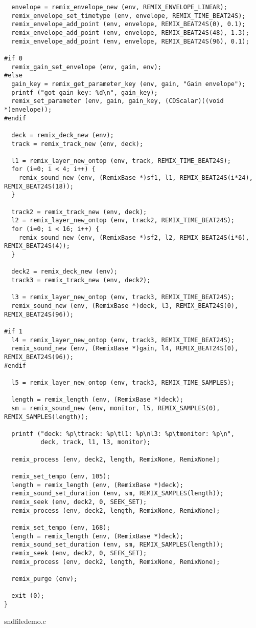 \begin{verbatim}
  envelope = remix_envelope_new (env, REMIX_ENVELOPE_LINEAR);
  remix_envelope_set_timetype (env, envelope, REMIX_TIME_BEAT24S);
  remix_envelope_add_point (env, envelope, REMIX_BEAT24S(0), 0.1);
  remix_envelope_add_point (env, envelope, REMIX_BEAT24S(48), 1.3);
  remix_envelope_add_point (env, envelope, REMIX_BEAT24S(96), 0.1);

#if 0
  remix_gain_set_envelope (env, gain, env);
#else
  gain_key = remix_get_parameter_key (env, gain, "Gain envelope");
  printf ("got gain key: %d\n", gain_key);
  remix_set_parameter (env, gain, gain_key, (CDScalar)((void *)envelope));
#endif

  deck = remix_deck_new (env);
  track = remix_track_new (env, deck);

  l1 = remix_layer_new_ontop (env, track, REMIX_TIME_BEAT24S);
  for (i=0; i < 4; i++) {
    remix_sound_new (env, (RemixBase *)sf1, l1, REMIX_BEAT24S(i*24), REMIX_BEAT24S(18));
  }

  track2 = remix_track_new (env, deck);
  l2 = remix_layer_new_ontop (env, track2, REMIX_TIME_BEAT24S);
  for (i=0; i < 16; i++) {
    remix_sound_new (env, (RemixBase *)sf2, l2, REMIX_BEAT24S(i*6), REMIX_BEAT24S(4));
  }

  deck2 = remix_deck_new (env);
  track3 = remix_track_new (env, deck2);

  l3 = remix_layer_new_ontop (env, track3, REMIX_TIME_BEAT24S);
  remix_sound_new (env, (RemixBase *)deck, l3, REMIX_BEAT24S(0), REMIX_BEAT24S(96));

#if 1
  l4 = remix_layer_new_ontop (env, track3, REMIX_TIME_BEAT24S);
  remix_sound_new (env, (RemixBase *)gain, l4, REMIX_BEAT24S(0), REMIX_BEAT24S(96));
#endif

  l5 = remix_layer_new_ontop (env, track3, REMIX_TIME_SAMPLES);

  length = remix_length (env, (RemixBase *)deck);
  sm = remix_sound_new (env, monitor, l5, REMIX_SAMPLES(0), REMIX_SAMPLES(length));

  printf ("deck: %p\ttrack: %p\tl1: %p\nl3: %p\tmonitor: %p\n",
          deck, track, l1, l3, monitor);

  remix_process (env, deck2, length, RemixNone, RemixNone);

  remix_set_tempo (env, 105);
  length = remix_length (env, (RemixBase *)deck);
  remix_sound_set_duration (env, sm, REMIX_SAMPLES(length));
  remix_seek (env, deck2, 0, SEEK_SET);
  remix_process (env, deck2, length, RemixNone, RemixNone);

  remix_set_tempo (env, 168);
  length = remix_length (env, (RemixBase *)deck);
  remix_sound_set_duration (env, sm, REMIX_SAMPLES(length));
  remix_seek (env, deck2, 0, SEEK_SET);
  remix_process (env, deck2, length, RemixNone, RemixNone);

  remix_purge (env);

  exit (0);
}
\end{verbatim}\normalsize
 sndfiledemo.c 

